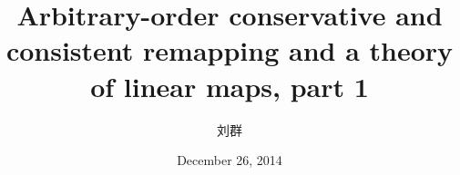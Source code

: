 \documentclass[unknownkeysallowed]{beamer}
\begin{document}
\title[Arbitrary-Order Remapping]{Arbitrary-order conservative and consistent remapping and a theory of linear maps, part 1}
\author{刘群} %
\date{December 26, 2014}%

\begin{frame}
\titlepage %
\end{frame}
\end{document}
